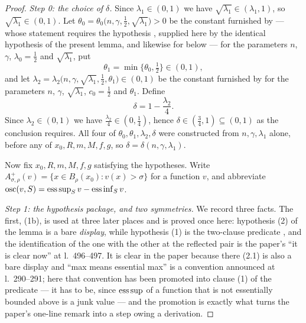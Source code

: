 \begin{proof}
\emph{Step 0: the choice of $\delta$.}  Since $\lambda_1\in(0,1)$ we have
$\sqrt{\lambda_1}\in(\lambda_1,1)$, so $\sqrt{\lambda_1}\in(0,1)$.  Let
$\theta_0=\theta_0\bigl(n,\gamma,\tfrac12,\sqrt{\lambda_1}\bigr)>0$ be the
constant furnished by  --- whose
statement requires the hypothesis , supplied
here by the identical hypothesis of the present lemma, and likewise for
 below --- for the
parameters $n$, $\gamma$, $\lambda_0=\tfrac12$ and $\sqrt{\lambda_1}$, put
\[
\theta_1=\min\bigl\{\theta_0,\tfrac12\bigr\}\in(0,1),
\]
and let $\lambda_2=\lambda_2\bigl(n,\gamma,\sqrt{\lambda_1},\tfrac12,\theta_1\bigr)
\in(0,1)$ be the constant furnished by  for
the parameters $n$, $\gamma$, $\sqrt{\lambda_1}$, $c_0=\tfrac12$ and $\theta_1$.
Define
\[
\delta=1-\frac{\lambda_2}4 .
\]
Since $\lambda_2\in(0,1)$ we have $\frac{\lambda_2}4\in(0,\tfrac14)$, hence
$\delta\in(\tfrac34,1)\subseteq(0,1)$ as the conclusion requires.  All four of
$\theta_0,\theta_1,\lambda_2,\delta$ were constructed from $n,\gamma,\lambda_1$
alone, before any of $x_0,R,m,M,f,g$, so $\delta=\delta(n,\gamma,\lambda_1)$.

Now fix $x_0,R,m,M,f,g$ satisfying the hypotheses.  Write
$A^+_{\sigma,\rho}(v)=\{x\in B_\rho(x_0):v(x)>\sigma\}$ for a function $v$, and
abbreviate $\operatorname*{osc}(v,S)=\operatorname*{ess\,sup}_Sv-\operatorname*{ess\,inf}_Sv$.

\emph{Step 1: the hypothesis package, and two symmetries.}  We record three
facts.  The first, (1b), is used at three later places and is proved once here:
hypothesis (2) of the lemma is a bare \emph{display}, while hypothesis (1) is the
two-clause predicate , and the identification of the
one with the other at the reflected pair is the paper's ``it is clear now'' at
l.~496--497.  It is clear in the paper because there (2.1) is also a bare display
and ``max means essential max'' is a convention announced at l.~290--291; here
that convention has been promoted into clause (1) of the predicate --- it has to
be, since $\operatorname*{ess\,sup}$ of a function that is not essentially bounded above is a junk
value --- and the promotion is exactly what turns the paper's one-line remark
into a step owing a derivation.


\end{proof}

